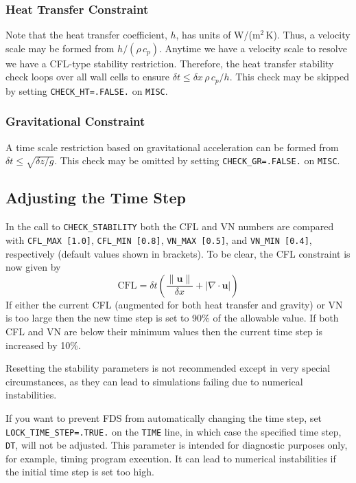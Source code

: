 \documentclass[11pt]{book}
\newcommand{\ct}{\tt\small}
\begin{document}
\subsubsection{Heat Transfer Constraint}

Note that the heat transfer coefficient, $h$, has units of W/(m$^2$\,K).  Thus, a velocity scale may be formed from $h/(\rho\, c_p)$.  Anytime we have a velocity scale to resolve we have a CFL-type stability restriction.  Therefore, the heat transfer stability check loops over all wall cells to ensure $\delta t \le \delta x \,\rho \,c_p/h$.  This check may be skipped by setting {\ct CHECK\_HT=.FALSE.} on {\ct MISC}.

\subsubsection{Gravitational Constraint}

A time scale restriction based on gravitational acceleration can be formed from $\delta t \le \sqrt{\delta z/g}$.  This check may be omitted by setting  {\ct CHECK\_GR=.FALSE.} on {\ct MISC}.

\subsection{Adjusting the Time Step} In the call to {\ct CHECK\_STABILITY} both the CFL and VN numbers are compared with {\ct CFL\_MAX [1.0]}, {\ct CFL\_MIN [0.8]}, {\ct VN\_MAX [0.5]}, and {\ct VN\_MIN [0.4]}, respectively (default values shown in brackets).  To be clear, the CFL constraint is now given by
\begin{equation}
\mbox{CFL} = \delta t \left( \frac{\|\mathbf{u}\|}{\delta x} + |\nabla\cdot\mathbf{u}| \right)
\end{equation}
If either the current CFL (augmented for both heat transfer and gravity) or VN is too large then the new time step is set to 90\% of the allowable value.  If both CFL and VN are below their minimum values then the current time step is increased by 10\%.

\begin{warning}
Resetting the stability parameters is not recommended except in very special circumstances, as they can lead to
simulations failing due to numerical instabilities.
\end{warning}

\noindent
If you want to prevent FDS from automatically changing the time step, set {\ct LOCK\_TIME\_STEP=.TRUE.}
on the {\ct TIME} line, in which case the specified
time step, {\ct DT}, will not be adjusted.
This parameter is intended for diagnostic purposes only, for example, timing program execution. It can lead to
numerical instabilities if the initial time step is set too high.
\end{document}
